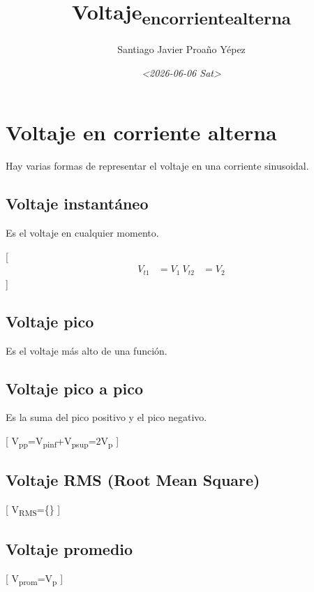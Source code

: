 \documentclass[11pt]{article}
\author{Santiago Javier Proaño Yépez}
\date{\textit{<2026-06-06 Sat>}}
\title{Voltaje\textsubscript{en}\textsubscript{corriente}\textsubscript{alterna}}
\begin{document}
\maketitle
\tableofcontents

\section{Voltaje en corriente alterna}
\label{sec:org511c8a9}

Hay varias formas de representar el voltaje en una corriente sinusoidal.

\subsection{Voltaje instantáneo}
\label{sec:org5f33480}

Es el voltaje en cualquier momento.

[
\begin{align}
V_{t1} &= V_1 \
V_{t2} &= V_2
\end{align}
]

\subsection{Voltaje pico}
\label{sec:org807d260}

Es el voltaje más alto de una función.

\subsection{Voltaje pico a pico}
\label{sec:org40f8ac9}

Es la suma del pico positivo y el pico negativo.

[
V\textsubscript{pp}=V\textsubscript{pinf}+V\textsubscript{psup}=2V\textsubscript{p}
]

\subsection{Voltaje RMS (Root Mean Square)}
\label{sec:org2e4f976}

[
V\textsubscript{RMS}=\{\}
]

\subsection{Voltaje promedio}
\label{sec:orgc0afef9}

[
V\textsubscript{prom}=V\textsubscript{p}
]
\end{document}
